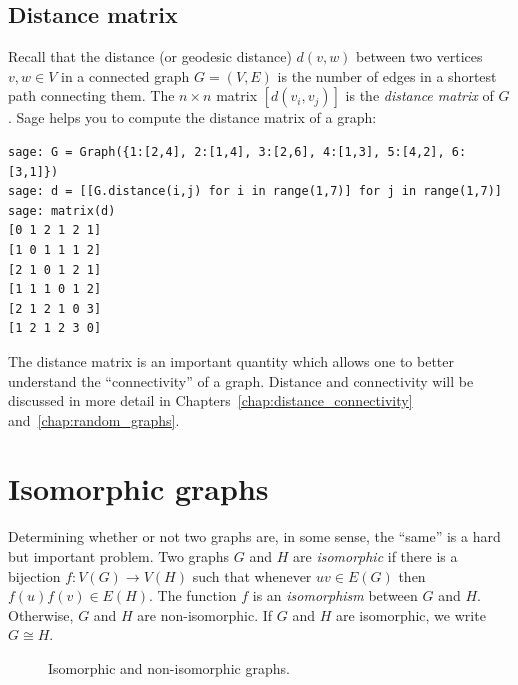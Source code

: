 \subsection{Distance matrix}

Recall that the distance (or geodesic distance) $d(v,w)$ between two
vertices $v,w \in V$ in a connected graph $G = (V,E)$ is the number of
edges in a shortest path connecting them. The $n \times n$ matrix
$[d(v_i, v_j)]$ is the \emph{distance matrix} of $G$. Sage helps you
to compute the distance matrix of a graph:
%
\begin{lstlisting}
sage: G = Graph({1:[2,4], 2:[1,4], 3:[2,6], 4:[1,3], 5:[4,2], 6:[3,1]})
sage: d = [[G.distance(i,j) for i in range(1,7)] for j in range(1,7)]
sage: matrix(d)
[0 1 2 1 2 1]
[1 0 1 1 1 2]
[2 1 0 1 2 1]
[1 1 1 0 1 2]
[2 1 2 1 0 3]
[1 2 1 2 3 0]
\end{lstlisting}

The distance matrix is an important quantity which allows one to
better understand the ``connectivity'' of a graph. Distance and
connectivity will be discussed in more detail in
Chapters~\ref{chap:distance_connectivity}
and~\ref{chap:random_graphs}.



\section{Isomorphic graphs}
\label{chap:introduction:isomorphic_graphs}

Determining whether or not two graphs are, in some sense, the ``same''
is a hard but important problem. Two graphs $G$ and $H$ are
\emph{isomorphic} if there is a bijection
$f: V(G) \longrightarrow V(H)$ such that whenever $uv \in E(G)$ then
$f(u) f(v) \in E(H)$. The function $f$ is an \emph{isomorphism}
between $G$ and $H$. Otherwise, $G$ and $H$ are non-isomorphic. If
$G$ and $H$ are isomorphic, we write $G \cong H$.
\index{$\cong$}

\begin{figure}[!htbp]
\centering

\caption{Isomorphic and non-isomorphic graphs.}
\label{fig:introduction:isomorphic_graphs}
\end{figure}

